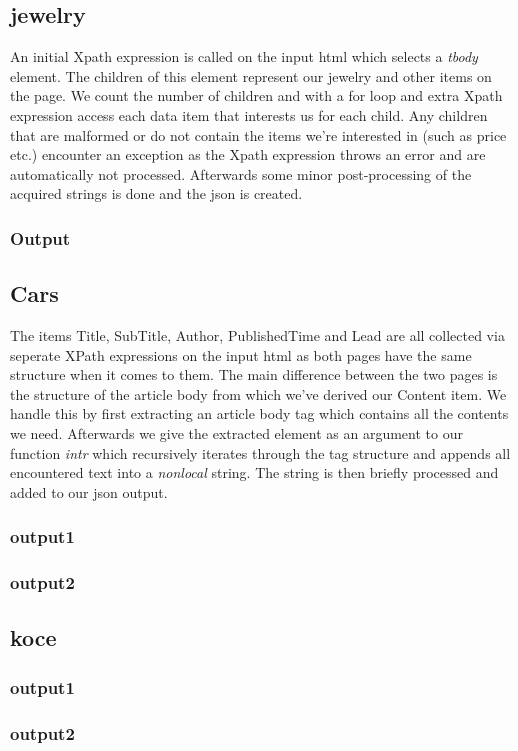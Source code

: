 \documentclass[runningheads]{llncs}
\begin{document}
\subsection{jewelry}
An initial Xpath expression is called on the input html which selects a \textit{tbody} element. The children of this element represent our jewelry and other items on the page. We count the number of children and with a for loop and extra Xpath expression access each data item that interests us for each child. Any children that are malformed or do not contain the items we're interested in (such as price etc.) encounter an exception as the Xpath expression throws an error and are automatically not processed. Afterwards some minor post-processing of the acquired strings is done and the json is created.
\subsubsection{Output}

\subsection{Cars}
The items Title, SubTitle, Author, PublishedTime and Lead are all collected via seperate XPath expressions on the input html as both pages have the same structure when it comes to them. The main difference between the two pages is the structure of the article body from which we've derived our Content item. We handle this by first extracting an article body tag which contains all the contents we need. Afterwards we give the extracted element as an argument to our function \textit{intr} which recursively iterates through the tag structure and appends all encountered text into a \textit{nonlocal} string. The string is then briefly processed and added to our json output.
\subsubsection{output1}
\subsubsection{output2}
\subsection{koce}
\subsubsection{output1}
\subsubsection{output2}
\end{document}
